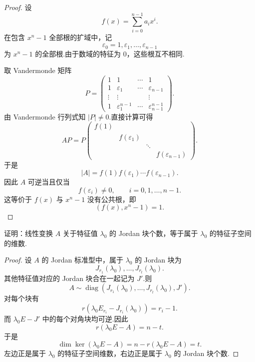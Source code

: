 \begin{proof}
	设
	\[
	f(x)=\sum_{i=0}^{n-1}a_ix^i.
	\]
	在包含 $x^n-1$ 全部根的扩域中，记
	\[
	\varepsilon_0=1,\varepsilon_1,\ldots,\varepsilon_{n-1}
	\]
	为 $x^n-1$ 的全部根.由于数域的特征为 $0$，这些根互不相同.
	
	取 Vandermonde 矩阵
	\[
	P=
	\begin{pmatrix}
		1&1&\cdots&1\\
		1&\varepsilon_1&\cdots&\varepsilon_{n-1}\\
		\vdots&\vdots&&\vdots\\
		1&\varepsilon_1^{n-1}&\cdots&\varepsilon_{n-1}^{n-1}
	\end{pmatrix}.
	\]
	由 Vandermonde 行列式知 $|P|\neq0$.直接计算可得
	\[
	AP=P
	\begin{pmatrix}
		f(1)&&&\\
		&f(\varepsilon_1)&&\\
		&&\ddots&\\
		&&&f(\varepsilon_{n-1})
	\end{pmatrix}.
	\]
	于是
	\[
	|A|=f(1)f(\varepsilon_1)\cdots f(\varepsilon_{n-1}).
	\]
	因此 $A$ 可逆当且仅当
	\[
	f(\varepsilon_i)\neq0,
	\qquad i=0,1,\ldots,n-1.
	\]
	这等价于 $f(x)$ 与 $x^n-1$ 没有公共根，即
	\[
	(f(x),x^n-1)=1.
	\]
\end{proof}

\begin{problem}[89]
	证明：线性变换 $A$ 关于特征值 $\lambda_0$ 的 Jordan 块个数，等于属于 $\lambda_0$ 的特征子空间的维数.
\end{problem}

\begin{proof}
	设 $A$ 的 Jordan 标准型中，属于 $\lambda_0$ 的 Jordan 块为
	\[
	J_{r_1}(\lambda_0),\ldots,J_{r_t}(\lambda_0).
	\]
	其他特征值对应的 Jordan 块合在一起记为 $J'$.则
	\[
	A\sim \operatorname{diag}(J_{r_1}(\lambda_0),\ldots,J_{r_t}(\lambda_0),J').
	\]
	对每个块有
	\[
	r(\lambda_0E_{r_i}-J_{r_i}(\lambda_0))=r_i-1.
	\]
	而 $\lambda_0E-J'$ 中的每个对角块均可逆.因此
	\[
	r(\lambda_0E-A)=n-t.
	\]
	于是
	\[
	\dim\ker(\lambda_0E-A)=n-r(\lambda_0E-A)=t.
	\]
	左边正是属于 $\lambda_0$ 的特征子空间维数，右边正是属于 $\lambda_0$ 的 Jordan 块个数.
\end{proof}

